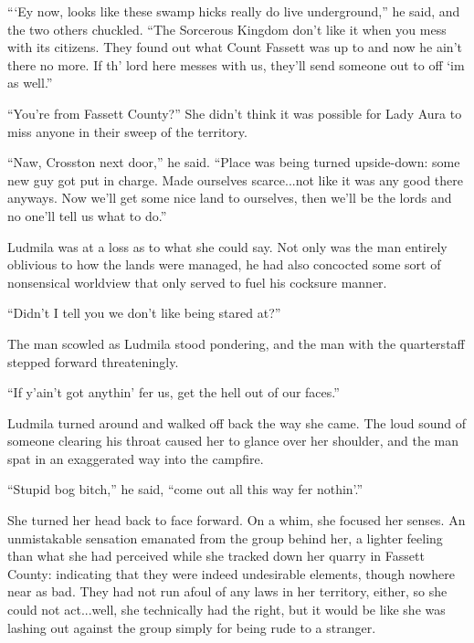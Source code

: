  

“‘Ey now, looks like these swamp hicks really do live underground,” he said, and the two others chuckled. “The Sorcerous Kingdom don’t like it when you mess with its citizens. They found out what Count Fassett was up to and now he ain’t there no more. If th’ lord here messes with us, they’ll send someone out to off ‘im as well.”

 

“You’re from Fassett County?” She didn’t think it was possible for Lady Aura to miss anyone in their sweep of the territory.

 

“Naw, Crosston next door,” he said. “Place was being turned upside-down: some new guy got put in charge. Made ourselves scarce...not like it was any good there anyways. Now we’ll get some nice land to ourselves, then we’ll be the lords and no one’ll tell us what to do.”

 

Ludmila was at a loss as to what she could say. Not only was the man entirely oblivious to how the lands were managed, he had also concocted some sort of nonsensical worldview that only served to fuel his cocksure manner.

 

“Didn’t I tell you we don’t like being stared at?”

 

The man scowled as Ludmila stood pondering, and the man with the quarterstaff stepped forward threateningly.

 

“If y’ain’t got anythin’ fer us, get the hell out of our faces.”

 

Ludmila turned around and walked off back the way she came. The loud sound of someone clearing his throat caused her to glance over her shoulder, and the man spat in an exaggerated way into the campfire.

 

“Stupid bog bitch,” he said, “come out all this way fer nothin’.”

 

She turned her head back to face forward. On a whim, she focused her senses. An unmistakable sensation emanated from the group behind her, a lighter feeling than what she had perceived while she tracked down her quarry in Fassett County: indicating that they were indeed undesirable elements, though nowhere near as bad. They had not run afoul of any laws in her territory, either, so she could not act...well, she technically had the right, but it would be like she was lashing out against the group simply for being rude to a stranger.

